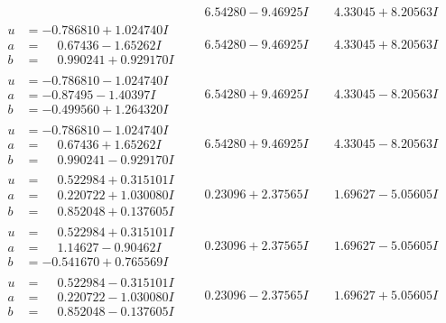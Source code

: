 \documentclass[1p]{elsarticle_modified}
\theoremstyle{definition}
\begin{document}
$$\begin{array}{c|c|c}
 & \phantom{-}6.54280 - 9.46925 I & \phantom{-}4.33045 + 8.20563 I \\ \hline\begin{aligned}
u &= -0.786810 + 1.024740 I \\
a &= \phantom{-}0.67436 - 1.65262 I \\
b &= \phantom{-}0.990241 + 0.929170 I\end{aligned}
 & \phantom{-}6.54280 - 9.46925 I & \phantom{-}4.33045 + 8.20563 I \\ \hline\begin{aligned}
u &= -0.786810 - 1.024740 I \\
a &= -0.87495 - 1.40397 I \\
b &= -0.499560 + 1.264320 I\end{aligned}
 & \phantom{-}6.54280 + 9.46925 I & \phantom{-}4.33045 - 8.20563 I \\ \hline\begin{aligned}
u &= -0.786810 - 1.024740 I \\
a &= \phantom{-}0.67436 + 1.65262 I \\
b &= \phantom{-}0.990241 - 0.929170 I\end{aligned}
 & \phantom{-}6.54280 + 9.46925 I & \phantom{-}4.33045 - 8.20563 I \\ \hline\begin{aligned}
u &= \phantom{-}0.522984 + 0.315101 I \\
a &= \phantom{-}0.220722 + 1.030080 I \\
b &= \phantom{-}0.852048 + 0.137605 I\end{aligned}
 & \phantom{-}0.23096 + 2.37565 I & \phantom{-}1.69627 - 5.05605 I \\ \hline\begin{aligned}
u &= \phantom{-}0.522984 + 0.315101 I \\
a &= \phantom{-}1.14627 - 0.90462 I \\
b &= -0.541670 + 0.765569 I\end{aligned}
 & \phantom{-}0.23096 + 2.37565 I & \phantom{-}1.69627 - 5.05605 I \\ \hline\begin{aligned}
u &= \phantom{-}0.522984 - 0.315101 I \\
a &= \phantom{-}0.220722 - 1.030080 I \\
b &= \phantom{-}0.852048 - 0.137605 I\end{aligned}
 & \phantom{-}0.23096 - 2.37565 I & \phantom{-}1.69627 + 5.05605 I \\ \hline\begin{aligned}

\end{aligned}
\end{array}$$
\end{document}
